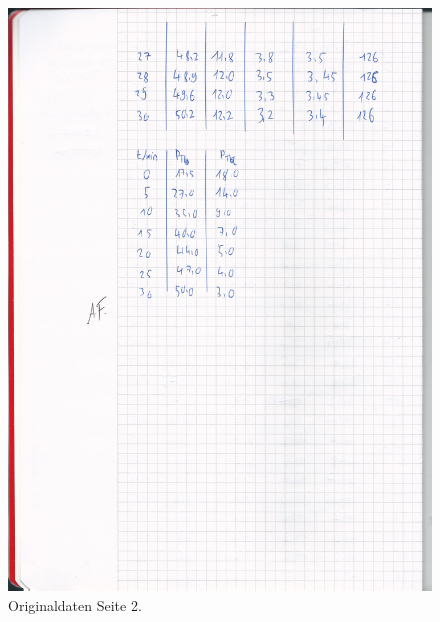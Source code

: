 \begin{figure}[H]
  \centering
  \includegraphics[width=\textwidth]{original_v206_2.jpg}
  \caption{Originaldaten Seite 2.}
  \label{fig:o2}
\end{figure}
\printbibliography



